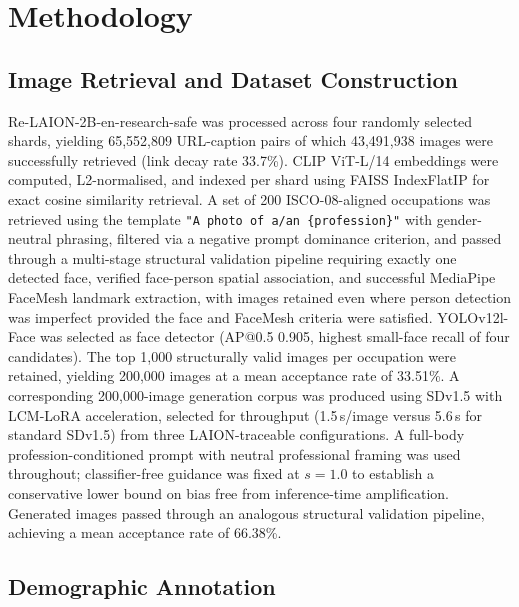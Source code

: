 \chapter{Methodology}

\section{Image Retrieval and Dataset Construction}

Re-LAION-2B-en-research-safe was processed across four randomly selected shards,
yielding 65,552,809 URL-caption pairs of which 43,491,938 images were successfully
retrieved (link decay rate 33.7\%). CLIP ViT-L/14 embeddings were computed, L2-normalised,
and indexed per shard using FAISS IndexFlatIP for exact cosine similarity retrieval. A
set of 200 ISCO-08-aligned occupations was retrieved using the template
\texttt{"A photo of a/an \{profession\}"} with gender-neutral phrasing, filtered via a
negative prompt dominance criterion, and passed through a multi-stage structural
validation pipeline requiring exactly one detected face, verified face-person spatial
association, and successful MediaPipe FaceMesh landmark extraction, with images retained
even where person detection was imperfect provided the face and FaceMesh criteria were satisfied.
YOLOv12l-Face was selected as face detector (AP@0.5 0.905, highest small-face recall of four candidates).
The top 1,000 structurally valid images per occupation were retained, yielding 200,000 images at a mean acceptance rate of 33.51\%.
A corresponding 200,000-image generation corpus was produced using SDv1.5 with LCM-LoRA
acceleration, selected for throughput (1.5\,s/image versus 5.6\,s for standard SDv1.5)
from three LAION-traceable configurations. A full-body profession-conditioned prompt
with neutral professional framing was used throughout; classifier-free guidance was fixed
at $s{=}1.0$ to establish a conservative lower bound on bias free from inference-time
amplification. Generated images passed through an analogous structural validation
pipeline, achieving a mean acceptance rate of 66.38\%.



\section{Demographic Annotation}

